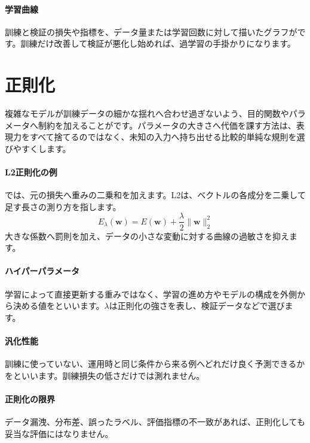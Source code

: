 \par
\endgroup
\medskip
\begingroup
\paragraph{学習曲線}
        訓練と検証の損失や指標を、データ量または学習回数に対して描いたグラフがです。訓練だけ改善して検証が悪化し始めれば、過学習の手掛かりになります。

\par
\endgroup
\par
\endgroup


\section{正則化}
\label{sec:06-machine-learning-11}

複雑なモデルが訓練データの細かな揺れへ合わせ過ぎないよう、目的関数やパラメータへ制約を加えることがです。パラメータの大きさへ代価を課す方法は、表現力をすべて捨てるのではなく、未知の入力へ持ち出せる比較的単純な規則を選びやすくします。

\begingroup
\begingroup
\paragraph{L2正則化の例}
        では、元の損失へ重みの二乗和を加えます。L2は、ベクトルの各成分を二乗して足す長さの測り方を指します。
        \[
          E_{\lambda}(\mathbf{w})=
          E(\mathbf{w})+\frac{\lambda}{2}\lVert\mathbf{w}\rVert_2^2
        \]
        大きな係数へ罰則を加え、データの小さな変動に対する曲線の過敏さを抑えます。

\paragraph{ハイパーパラメータ}
        学習によって直接更新する重みではなく、学習の進め方やモデルの構成を外側から決める値をといいます。$\lambda$は正則化の強さを表し、検証データなどで選びます。

\par
\endgroup
\medskip
\begingroup
\paragraph{汎化性能}
        訓練に使っていない、運用時と同じ条件から来る例へどれだけ良く予測できるかをといいます。訓練損失の低さだけでは測れません。

\paragraph{正則化の限界}
        データ漏洩、分布差、誤ったラベル、評価指標の不一致があれば、正則化しても妥当な評価にはなりません。

